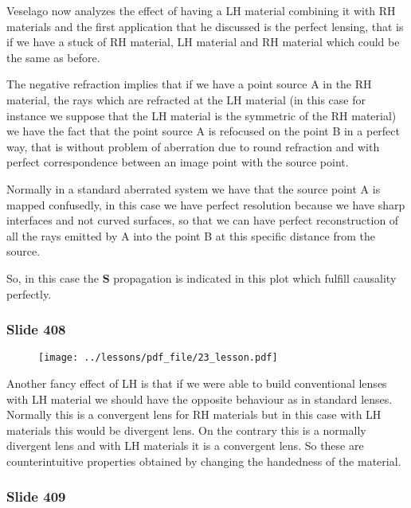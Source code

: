 \documentclass[../main/main.tex]{subfiles}
\begin{document}
Veselago now analyzes the effect of having a LH material combining it with RH materials and the first application that he discussed is the perfect lensing, that is if we have a stuck of RH material, LH material and RH material which could be the same as before.

The negative refraction implies that if we have a point source A in the RH material, the rays which are refracted at the LH material (in this case for instance we suppose that the LH material is the symmetric of the RH material) we have the fact that the point source A is refocused on the point B in a perfect way, that is without problem of aberration due to round refraction and with perfect correspondence between an image point with the source point.

Normally in a standard aberrated system we have that the source point A is mapped confusedly, in this case we have perfect resolution because we have sharp interfaces and not curved surfaces, so that we can have perfect reconstruction of all the rays emitted by A into the point B at this specific distance from the source. 

So, in this case the $\mathbf{S}$ propagation is indicated in this plot which fulfill causality perfectly. 

\newpage

\subsubsection{Slide 408}

\begin{figure}[h!]
\centering
\texttt{[image: ../lessons/pdf\_file/23\_lesson.pdf]}
\end{figure}

Another fancy effect of LH is that if we were able to build conventional lenses with LH material we should have the opposite behaviour as in standard lenses. Normally this is a convergent lens for RH materials but in this case with LH materials this would be divergent lens. On the contrary this is a normally divergent lens and with LH materials it is a convergent lens. So these are counterintuitive properties obtained by changing the handedness of the material.

\newpage

\subsubsection{Slide 409}
\end{document}
